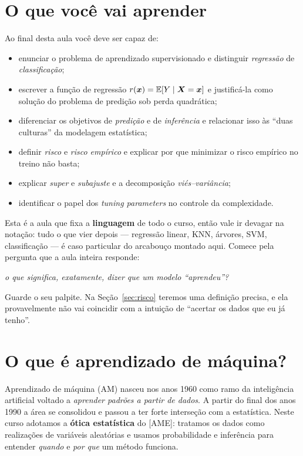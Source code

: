 \documentclass[11pt,a4paper]{article}
\title{}
\date{}
\begin{document}

\section*{O que você vai aprender}
Ao final desta aula você deve ser capaz de:
\begin{itemize}[leftmargin=1.4cm]
  \item enunciar o problema de aprendizado supervisionado e distinguir
        \emph{regressão} de \emph{classificação};
  \item escrever a função de regressão $r(\bm{x})=\mathbb{E}[Y\mid\bm{X}=\bm{x}]$ e justificá-la como
        solução do problema de predição sob perda quadrática;
  \item diferenciar os objetivos de \emph{predição} e de \emph{inferência} e
        relacionar isso às ``duas culturas'' da modelagem estatística;
  \item definir \emph{risco} e \emph{risco empírico} e explicar por que minimizar o
        risco empírico no treino não basta;
  \item explicar \emph{super} e \emph{subajuste} e a decomposição
        \emph{viés--variância};
  \item identificar o papel dos \emph{tuning parameters} no controle da
        complexidade.
\end{itemize}

\noindent
Esta é a aula que fixa a \textbf{linguagem} de todo o curso, então vale ir devagar
na notação: tudo o que vier depois --- regressão linear, KNN, árvores, SVM,
classificação --- é caso particular do arcabouço montado aqui. Comece pela pergunta
que a aula inteira responde:

\begin{center}\itshape
  o que significa, exatamente, dizer que um modelo ``aprendeu''?
\end{center}

\noindent
Guarde o seu palpite. Na Seção~\ref{sec:risco} teremos uma definição precisa, e ela
provavelmente não vai coincidir com a intuição de ``acertar os dados que eu já
tenho''.

\section{O que é aprendizado de máquina?}
Aprendizado de máquina (AM) nasceu nos anos 1960 como ramo da inteligência
artificial voltado a \emph{aprender padrões a partir de dados}. A partir do final
dos anos 1990 a área se consolidou e passou a ter forte interseção com a
estatística. Neste curso adotamos a \textbf{ótica estatística} do [AME]: tratamos
os dados como realizações de variáveis aleatórias e usamos probabilidade e
inferência para entender \emph{quando} e \emph{por que} um método funciona.
\end{document}
